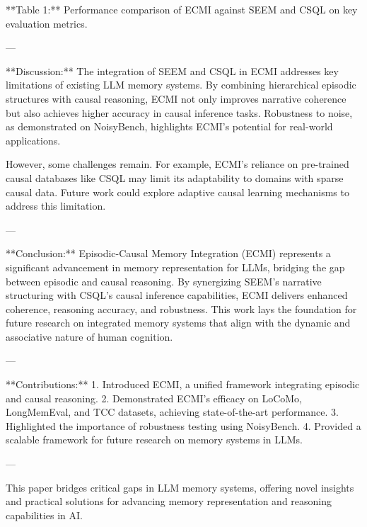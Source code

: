 **Table 1:** Performance comparison of ECMI against SEEM and CSQL on key evaluation metrics.

---

**Discussion:**  
The integration of SEEM and CSQL in ECMI addresses key limitations of existing LLM memory systems. By combining hierarchical episodic structures with causal reasoning, ECMI not only improves narrative coherence but also achieves higher accuracy in causal inference tasks. Robustness to noise, as demonstrated on NoisyBench, highlights ECMI's potential for real-world applications.  

However, some challenges remain. For example, ECMI's reliance on pre-trained causal databases like CSQL may limit its adaptability to domains with sparse causal data. Future work could explore adaptive causal learning mechanisms to address this limitation.

---

**Conclusion:**  
Episodic-Causal Memory Integration (ECMI) represents a significant advancement in memory representation for LLMs, bridging the gap between episodic and causal reasoning. By synergizing SEEM's narrative structuring with CSQL's causal inference capabilities, ECMI delivers enhanced coherence, reasoning accuracy, and robustness. This work lays the foundation for future research on integrated memory systems that align with the dynamic and associative nature of human cognition.

---

**Contributions:**  
1. Introduced ECMI, a unified framework integrating episodic and causal reasoning.  
2. Demonstrated ECMI's efficacy on LoCoMo, LongMemEval, and TCC datasets, achieving state-of-the-art performance.  
3. Highlighted the importance of robustness testing using NoisyBench.  
4. Provided a scalable framework for future research on memory systems in LLMs.  

--- 

This paper bridges critical gaps in LLM memory systems, offering novel insights and practical solutions for advancing memory representation and reasoning capabilities in AI.